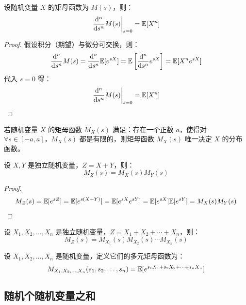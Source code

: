 \begin{theorem}[矩母函数计算矩]
设随机变量 $X$ 的矩母函数为 $M(s)$，则：
\[
\left.\frac{\mathrm d^n}{\mathrm ds^n}M(s)\right|_{s=0}=\mathbb{E}[X^n]
\]
\end{theorem}
\begin{proof}
假设积分（期望）与微分可交换，则：
\[
\frac{\mathrm d^n}{\mathrm ds^n}M(s)=\frac{\mathrm d^n}{\mathrm ds^n}\mathbb{E}[e^{sX}]=\mathbb{E}\left[\frac{\mathrm d^n}{\mathrm ds^n}e^{sX}\right]=\mathbb{E}[X^ne^{sX}]
\]
代入 $s=0$ 得：
\[
\left.\frac{\mathrm d^n}{\mathrm ds^n}M(s)\right|_{s=0}=\mathbb{E}[X^n]
\]
\end{proof}

\begin{theorem}[矩母函数与分布]
若随机变量 $X$ 的矩母函数 $M_X(s)$ 满足：存在一个正数 $a$，使得对 $\forall s\in[-a,a]$，$M_X(s)$ 都是有限的，则矩母函数 $M_X(s)$ 唯一决定 $X$ 的分布函数。
\end{theorem}

\begin{theorem}[独立随机变量之和]
设 $X,Y$ 是独立随机变量，$Z=X+Y$，则：
\[M_Z(s)=M_X(s)M_Y(s)\]
\end{theorem}
\begin{proof}
\[
M_Z(s)=\mathbb{E}[e^{sZ}]=\mathbb{E}[e^{s(X+Y)}]=\mathbb{E}[e^{sX}e^{sY}]=\mathbb{E}[e^{sX}]\mathbb{E}[e^{sY}]=M_X(s)M_Y(s)
\]
\end{proof}
\begin{corollary}
设 $X_1,X_2,\ldots,X_n$ 是独立随机变量，$Z=X_1+X_2+\cdots+X_n$，则：
\[
M_Z(s)=M_{X_1}(s)M_{X_2}(s)\cdots M_{X_n}(s)
\]
\end{corollary}

\begin{definition}[多元矩母函数]
设 $X_1,X_2,\ldots,X_n$ 是随机变量，定义它们的多元矩母函数为：
\[
M_{X_1,X_2,\ldots,X_n}(s_1,s_2,\ldots,s_n)=\mathbb{E}[e^{s_1X_1+s_2X_2+\cdots+s_nX_n}]
\]
\end{definition}


\subsection{随机个随机变量之和}

